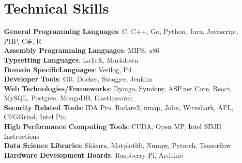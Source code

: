 \section{Technical Skills}
\begin{itemize}[leftmargin=0.15in, label={}]
    \small{\item{
            \textbf{General Programming Languages}{: C, C++, Go, Python, Java, Javascript, PHP, C\#, R} \\
                \textbf{Assembly Programming Languages}{: MIPS, x86} \\
                \textbf{Typsetting Languages}{: LaTeX, Markdown} \\
                \textbf{Domain SpecificLanguages}{: Verilog, P4} \\
            \textbf{Developer Tools}{: Git, Docker, Swagger, Jenkins} \\
            \textbf{Web Technologies/Frameworks}{: Django, Symfony, ASP.net Core, React, MySQL, Postgres, MongoDB, Elasticsearch} \\
            \textbf{Security Related Tools}{: IDA Pro, Radare2, nmap, John, Wireshark, AFL, CFGGrind, Intel Pin}\\
            \textbf{High Performance Computing Tools}{: CUDA, Open MP, Intel SIMD Instructions}
            \\
            \textbf{Data Science Libraries}{: Sklearn, Matplotlib, Numpy, Pytorch, Tensorflow}\\
            \textbf{Hardware Development Boards}{: Raspberry Pi, Arduino}
            
            
    }}
\end{itemize}

